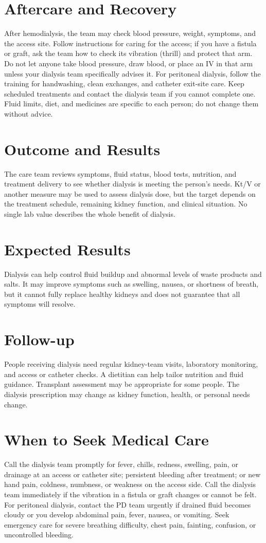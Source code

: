 \section*{Aftercare and Recovery}
After hemodialysis, the team may check blood pressure, weight, symptoms, and the access site. Follow instructions for caring for the access; if you have a fistula or graft, ask the team how to check its vibration (thrill) and protect that arm. Do not let anyone take blood pressure, draw blood, or place an IV in that arm unless your dialysis team specifically advises it. For peritoneal dialysis, follow the training for handwashing, clean exchanges, and catheter exit-site care. Keep scheduled treatments and contact the dialysis team if you cannot complete one. Fluid limits, diet, and medicines are specific to each person; do not change them without advice.

\section*{Outcome and Results}
The care team reviews symptoms, fluid status, blood tests, nutrition, and treatment delivery to see whether dialysis is meeting the person's needs. Kt/V or another measure may be used to assess dialysis dose, but the target depends on the treatment schedule, remaining kidney function, and clinical situation. No single lab value describes the whole benefit of dialysis.

\section*{Expected Results}
Dialysis can help control fluid buildup and abnormal levels of waste products and salts. It may improve symptoms such as swelling, nausea, or shortness of breath, but it cannot fully replace healthy kidneys and does not guarantee that all symptoms will resolve.

\section*{Follow-up}
People receiving dialysis need regular kidney-team visits, laboratory monitoring, and access or catheter checks. A dietitian can help tailor nutrition and fluid guidance. Transplant assessment may be appropriate for some people. The dialysis prescription may change as kidney function, health, or personal needs change.

\section*{When to Seek Medical Care}
Call the dialysis team promptly for fever, chills, redness, swelling, pain, or drainage at an access or catheter site; persistent bleeding after treatment; or new hand pain, coldness, numbness, or weakness on the access side. Call the dialysis team immediately if the vibration in a fistula or graft changes or cannot be felt. For peritoneal dialysis, contact the PD team urgently if drained fluid becomes cloudy or you develop abdominal pain, fever, nausea, or vomiting. Seek emergency care for severe breathing difficulty, chest pain, fainting, confusion, or uncontrolled bleeding.

